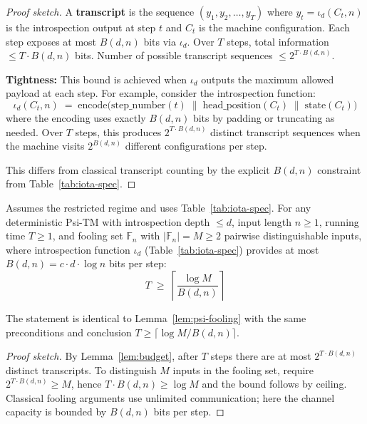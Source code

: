 \begin{proof}[Proof sketch]
A \textbf{transcript} is the sequence $(y_1, y_2, \ldots, y_T)$ where $y_t = \iota_d(C_t, n)$ is the introspection output at step $t$ and $C_t$ is the machine configuration. Each step exposes at most $B(d,n)$ bits via $\iota_d$. Over $T$ steps, total information $\leq T \cdot B(d,n)$ bits. Number of possible transcript sequences $\leq 2^{T \cdot B(d,n)}$.

\textbf{Tightness:} This bound is achieved when $\iota_d$ outputs the maximum allowed payload at each step. For example, consider the introspection function:
\[
\iota_d(C_t, n) \;=\; \text{encode}\big(\text{step\_number}(t) \;\|\; \text{head\_position}(C_t) \;\|\; \text{state}(C_t)\big)
\]
where the encoding uses exactly $B(d,n)$ bits by padding or truncating as needed. Over $T$ steps, this produces $2^{T \cdot B(d,n)}$ distinct transcript sequences when the machine visits $2^{B(d,n)}$ different configurations per step.

This differs from classical transcript counting by the explicit $B(d,n)$ constraint from Table~\ref{tab:iota-spec}.
\end{proof}

\begin{lemma}
\label{lem:psi-fooling}
Assumes the restricted regime and uses Table~\ref{tab:iota-spec}.
For any deterministic Psi-TM with introspection depth $\leq d$, input length $n \geq 1$, running time $T \geq 1$, and fooling set $\mathbb{F}_n$ with $|\mathbb{F}_n| = M \geq 2$ pairwise distinguishable inputs, where introspection function $\iota_d$ (Table~\ref{tab:iota-spec}) provides at most $B(d,n) = c \cdot d \cdot \log n$ bits per step:
\begin{equation}
\label{eq:fooling-bound}
T \;\geq\; \left\lceil \frac{\log M}{B(d,n)} \right\rceil
\end{equation}
\end{lemma}

\begin{theorem}
\label{thm:psi-fooling}\label{Lk:psi-fooling}
The statement is identical to Lemma~\ref{lem:psi-fooling} with the same preconditions and conclusion $T\ge \lceil \log M / B(d,n)\rceil$.
\end{theorem}

\begin{proof}[Proof sketch]
By Lemma~\ref{lem:budget}, after $T$ steps there are at most $2^{T \cdot B(d,n)}$ distinct transcripts. To distinguish $M$ inputs in the fooling set, require $2^{T \cdot B(d,n)} \ge M$, hence $T \cdot B(d,n) \ge \log M$ and the bound follows by ceiling. Classical fooling arguments use unlimited communication; here the channel capacity is bounded by $B(d,n)$ bits per step.
\end{proof}

